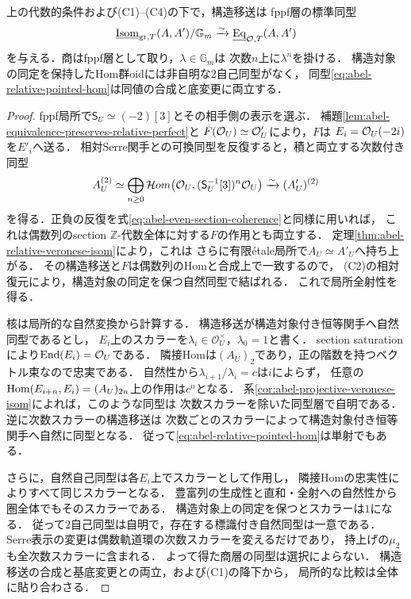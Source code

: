 \begin{theorem}[構造対象付き同値の相対同型層]
\label{thm:abel-relative-pointed-hom}
上の代数的条件および\textup{(C1)}--\textup{(C4)}の下で，構造移送は
fppf層の標準同型
\begin{equation}\label{eq:abel-relative-pointed-hom}
 \underline{\operatorname{Isom}}_{\mathrm{gr},T}(A,A')/\mathbb G_m
 \xrightarrow{\sim}
 \underline{\operatorname{Eq}}_{\mathcal O,T}(A,A')
\end{equation}
を与える．商はfppf層として取り，$\lambda\in\mathbb G_m$は
次数$n$上に$\lambda^n$を掛ける．
構造対象の同定を保持したHom群oidには非自明な2自己同型がなく，
同型\eqref{eq:abel-relative-pointed-hom}は同値の合成と底変更に両立する．
\end{theorem}
\begin{proof}
fppf局所で$\mathsf S_U\simeq(-2)[3]$とその相手側の表示を選ぶ．
補題\ref{lem:abel-equivalence-preserves-relative-perfect}と
$F(\mathcal O_U)\simeq\mathcal O'_U$により，$F$は
$E_i=\mathcal O_U(-2i)$を$E'_i$へ送る．
相対Serre関手との可換同型を反復すると，積と両立する次数付き同型
\[
 A_U^{(2)}
 \simeq\bigoplus_{n\ge0}
 \mathcal Hom\bigl(\mathcal O_U,(\mathsf S_U^{-1}[3])^n\mathcal O_U\bigr)
 \xrightarrow{\sim}(A'_U)^{(2)}
\]
を得る．正負の反復を式\eqref{eq:abel-even-section-coherence}と同様に用いれば，
これは偶数列のsection $\mathbb Z$-代数全体に対する$F$の作用とも両立する．
定理\ref{thm:abel-relative-veronese-isom}により，これは
さらに有限\'etale局所で$A_U\simeq A'_U$へ持ち上がる．
その構造移送と$F$は偶数列のHomと合成上で一致するので，
\textup{(C2)}の相対復元により，構造対象の同定を保つ自然同型で結ばれる．
これで局所全射性を得る．

核は局所的な自然変換から計算する．
構造移送が構造対象付き恒等関手へ自然同型であるとし，
$E_i$上のスカラーを$\lambda_i\in\mathcal O_U^\times$，$\lambda_0=1$と書く．
section saturationにより$\operatorname{End}(E_i)=\mathcal O_U$である．
隣接Homは$(A_U)_2$であり，正の階数を持つベクトル束なので忠実である．
自然性から$\lambda_{i+1}/\lambda_i=c$は$i$によらず，
任意の$\operatorname{Hom}(E_{i+n},E_i)=(A_U)_{2n}$上の作用は$c^n$となる．
系\ref{cor:abel-projective-veronese-isom}によれば，このような同型は
次数スカラーを除いた同型層で自明である．逆に次数スカラーの構造移送は
次数ごとのスカラーによって構造対象付き恒等関手へ自然に同型となる．
従って\eqref{eq:abel-relative-pointed-hom}は単射でもある．

さらに，自然自己同型は各$E_i$上でスカラーとして作用し，
隣接Homの忠実性によりすべて同じスカラーとなる．
豊富列の生成性と直和・全射への自然性から圏全体でもそのスカラーである．
構造対象上の同定を保つとスカラーは$1$になる．
従って2自己同型は自明で，存在する標識付き自然同型は一意である．
Serre表示の変更は偶数軌道環の次数スカラーを変えるだけであり，
持上げの$\mu_2$も全次数スカラーに含まれる．
よって得た商層の同型は選択によらない．
構造移送の合成と基底変更との両立，および\textup{(C1)}の降下から，
局所的な比較は全体に貼り合わさる．
\end{proof}


